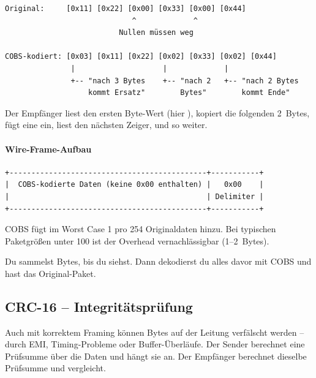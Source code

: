 \begin{lstlisting}[style=base,numbers=none]
Original:     [0x11] [0x22] [0x00] [0x33] [0x00] [0x44]
                             ^             ^
                          Nullen müssen weg

COBS-kodiert: [0x03] [0x11] [0x22] [0x02] [0x33] [0x02] [0x44]
               |                    |             |
               +-- "nach 3 Bytes    +-- "nach 2   +-- "nach 2 Bytes
                   kommt Ersatz"        Bytes"        kommt Ende"
\end{lstlisting}

Der Empfänger liest den ersten Byte-Wert (hier ), kopiert die folgenden
2~Bytes, fügt eine  ein, liest den nächsten Zeiger, und so weiter.

\paragraph{Wire-Frame-Aufbau}

\begin{lstlisting}[style=base,numbers=none]
+---------------------------------------------+-----------+
|  COBS-kodierte Daten (keine 0x00 enthalten) |   0x00    |
|                                             | Delimiter |
+---------------------------------------------+-----------+
\end{lstlisting}

COBS fügt im Worst Case \SI{1}{\byte} pro \SI{254}{\byte} Originaldaten hinzu.
Bei typischen Paketgrößen unter \SI{100}{\byte} ist der Overhead vernachlässigbar
(1--2~Bytes).

\begin{infobox}
Du sammelst Bytes, bis du  siehst. Dann dekodierst du alles davor mit COBS
und hast das Original-Paket.
\end{infobox}

\subsection{CRC-16 -- Integritätsprüfung}
\label{subsec:crc16}

Auch mit korrektem Framing können Bytes auf der Leitung verfälscht werden -- durch EMI,
Timing-Probleme oder Buffer-Überläufe. Der Sender berechnet eine Prüfsumme über die
Daten und hängt sie an. Der Empfänger berechnet dieselbe Prüfsumme und vergleicht.

